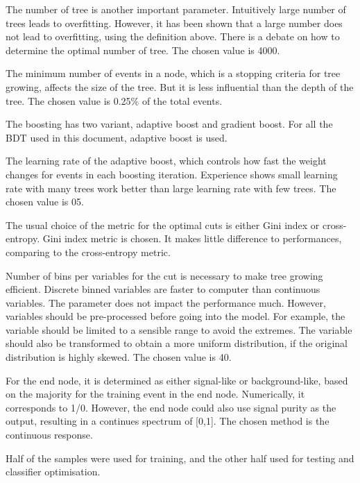 The number of tree is another important parameter. Intuitively large number of trees leads to overfitting. However, it has been shown that a large number does not lead to overfitting, using the definition above. There is a debate on how to determine the optimal number of tree. The chosen value is 4000.

The minimum number of events in a node, which is a stopping criteria for tree growing, affects the size of the tree. But it is less influential than the depth of the tree. The chosen value is 0.25\% of the total events.

The boosting has two variant, adaptive boost and gradient boost. For all the BDT used in this document, adaptive boost is used.

The learning rate of the adaptive boost, which controls how fast the weight changes for events in each boosting iteration. Experience shows small learning rate with many trees work better than large learning rate with few trees. The chosen value is 05.

The usual choice of the metric for the optimal cuts is either Gini index or cross-entropy. Gini index metric is chosen. It makes little difference to performances, comparing to the cross-entropy metric.

Number of bins per variables for the cut is necessary to make tree growing efficient. Discrete binned variables are faster to computer than continuous variables. The parameter does not impact the performance much. However, variables should be pre-processed before going into the model. For example, the variable should be limited to a sensible range to avoid the extremes. The variable should also be transformed to obtain a more uniform distribution, if the original distribution is highly skewed. The chosen value is 40.

For the end node, it is determined as either signal-like or background-like, based on the majority for the training event in the end node. Numerically, it corresponds to 1/0. However, the end node could also use signal purity as the output, resulting in a continues spectrum of [0,1]. The chosen method is the continuous response.

Half of the samples were used for training, and the other half used for testing and classifier optimisation.

